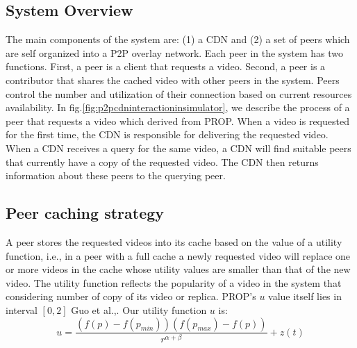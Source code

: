 \documentclass[10pt,final,journal,a4paper]{IEEEtran}
\begin{document}
\subsection{System Overview}\label{systemoverview}
The main components of the system are: (1) a CDN and (2) a set of peers which are self organized into a P2P overlay network.
Each peer in the system has two functions.
First, a peer is a client that requests a video. 
Second, a peer is a contributor that shares the cached video with other peers in the system. 
Peers control the number and utilization of their connection based on current resources availability.
In fig.\ref{fig:p2pcdninteractioninsimulator}, we describe the process of a peer that requests a video which derived from PROP.
When a video is requested for the first time, the CDN is responsible for delivering the requested video.
When a CDN receives a query for the same video, a CDN will find suitable peers that currently have a copy of the requested video.
The CDN then returns information about these peers to the querying peer.





\subsection{Peer caching strategy}\label{peercachingstrategy}
A peer stores the requested videos into its cache based on the value of a utility function, i.e., in a peer with a full cache a newly requested video will replace one or more videos in the cache whose utility values are smaller than that of the new video.
The utility function reflects the popularity of a video in the system that considering number of copy of its video or replica. 
PROP's $u$ value itself lies in interval $[0,2]$ Guo et al.,\cite{1613869}.
Our utility function $u$ is:
\begin{equation}
u = \frac{ (f(p) - f(p_{min})) (f(p_{max}) - f(p)) }{r^{\alpha + \beta}} + z(t)
\end{equation}
\end{document}
